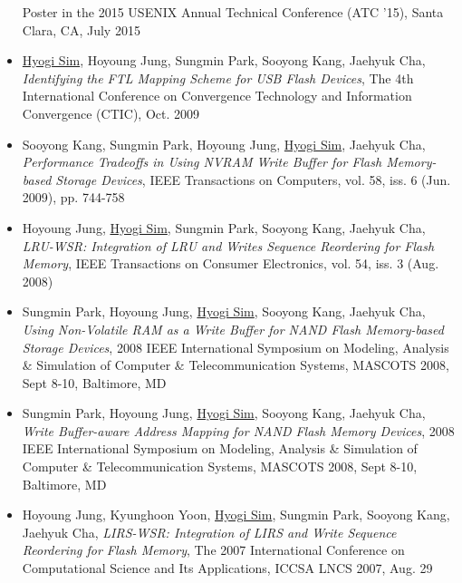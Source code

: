 \begin{itemize}
  Poster in the 2015 USENIX Annual Technical Conference (ATC '15),
  Santa Clara, CA, July 2015
\item \underline{Hyogi Sim}, Hoyoung Jung, Sungmin Park, Sooyong Kang, Jaehyuk Cha,
  {\it Identifying the FTL Mapping Scheme for USB Flash Devices},
  The 4th International Conference on Convergence Technology
  and Information Convergence (CTIC), Oct. 2009 %
\item Sooyong Kang, Sungmin Park, Hoyoung Jung, \underline{Hyogi Sim}, Jaehyuk Cha,
  {\it Performance Tradeoffs in Using NVRAM Write Buffer for Flash Memory-based
  Storage Devices},
  IEEE Transactions on Computers, vol. 58, iss. 6 (Jun. 2009), pp. 744-758
\item Hoyoung Jung, \underline{Hyogi Sim}, Sungmin Park, Sooyong Kang, Jaehyuk Cha,
 {\it LRU-WSR: Integration of LRU and Writes Sequence Reordering for Flash
 Memory},
 IEEE Transactions on Consumer Electronics, vol. 54, iss. 3 (Aug. 2008)
\item Sungmin Park, Hoyoung Jung, \underline{Hyogi Sim}, Sooyong Kang, Jaehyuk Cha,
 {\it Using Non-Volatile RAM as a Write Buffer for NAND Flash Memory-based
 Storage Devices},
 2008 IEEE International Symposium on Modeling, Analysis \& Simulation of
 Computer \& Telecommunication Systems, MASCOTS 2008, Sept 8-10, Baltimore, MD
\item Sungmin Park, Hoyoung Jung, \underline{Hyogi Sim}, Sooyong Kang, Jaehyuk Cha,
 {\it Write Buffer-aware Address Mapping for NAND Flash Memory Devices},
 2008 IEEE International Symposium on Modeling, Analysis \& Simulation of
 Computer \& Telecommunication Systems, MASCOTS 2008, Sept 8-10, Baltimore, MD
\item Hoyoung Jung, Kyunghoon Yoon, \underline{Hyogi Sim},
 Sungmin Park, Sooyong Kang, Jaehyuk Cha,
 {\it LIRS-WSR: Integration of LIRS and Write Sequence Reordering for Flash
 Memory},
 The 2007 International Conference on Computational Science and Its
 Applications, ICCSA LNCS 2007, Aug. 29
\end{itemize}

